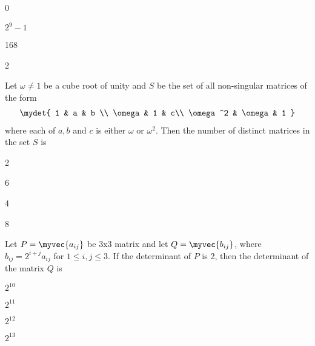                 \begin{enumerate}
                        \begin{multicols}{4}
                        \item 0 \columnbreak
                        \item $2^9 - 1$ \columnbreak
                        \item 168 \columnbreak
                        \item 2
                        \end{multicols}
                \end{enumerate}
            \item Let $\omega \neq 1$ be a cube root of unity and $S$ be the set of all non-singular matrices of the form 
                \begin{align*}
                    \mydet{
                        1 & a & b \\
                        \omega & 1 & c\\
                        \omega^2 & \omega & 1
                    }
                \end{align*} where each of $a,b$ and $c$ is either $\omega$ or $\omega^2$. Then the number of distinct matrices in the set $S$ is
                \hfill{}

                \begin{enumerate}

                        \begin{multicols}{4}
                        \item 2\columnbreak
                        \item 6\columnbreak
                        \item 4\columnbreak
                        \item 8
                        \end{multicols}
                \end{enumerate}

            \item Let $P = \myvec{a_{ij}}$ be 3x3 matrix and let $Q =  \myvec{b_{ij}}$, where $b_{ij} = 2^{i+j}a_{ij}$ for $1 \le i,j \le 3$. If the determinant of $P$ is 2, then the determinant of the matrix $Q$ is 
                \hfill{}
                \begin{enumerate}

                        \begin{multicols}{4}
                        \item $2^{10}$ \columnbreak
                        \item $2^{11}$ \columnbreak
                        \item $2^{12}$\columnbreak
                        \item $2^{13}$
                        \end{multicols}
                \end{enumerate}

